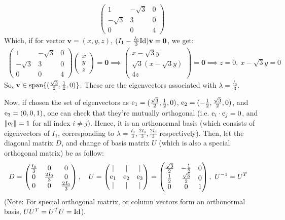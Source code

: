 \documentclass{article}
\newcommand{\Id}{\textmd{Id}} %
\newcommand{\be}{\textmd{e}}
\newcommand{\bv}{\textbf{v}} %
\newcommand{\bzero}{\textbf{0}}
\begin{document}
\begin{itemize}
\begin{align}
\begin{pmatrix}
            1&-\sqrt{3}&0\\
            -\sqrt{3}&3&0\\
            0&0&4
        \end{pmatrix}
    \end{align}
    Which, if for vector $\bv = (x,y,z)$, $(I_1-\frac{I_0}{3}\Id)\bv=\bzero$, we get:
    \begin{align}
        \begin{pmatrix}
            1&-\sqrt{3}&0\\
            -\sqrt{3}&3&0\\
            0&0&4
        \end{pmatrix}\begin{pmatrix}
            x\\y\\z
        \end{pmatrix} = \bzero \implies \begin{pmatrix}
            x-\sqrt{3}y\\ \sqrt{3}(x-\sqrt{3}y)\\ 4z
        \end{pmatrix}=\bzero\implies z=0,\ x-\sqrt{3}y=0
    \end{align}
    So, $\bv\in \textmd{span}\{(\frac{\sqrt{3}}{2},\frac{1}{2},0)\}$. These are the eigenvectors associated with $\lambda = \frac{I_0}{3}$.
\end{itemize}
Now, if chosen the set of eigenvectors as $\be_1 = (\frac{\sqrt{3}}{2},\frac{1}{2},0)$, $\be_2=(-\frac{1}{2},\frac{\sqrt{3}}{2},0)$, and $\be_3 = (0,0,1)$, one can check that they're mutually orthogonal (i.e. $\be_i \cdot \be_j = 0$, and $\|\be_i\|=1$ for all index $i\neq j$). Hence, it is an orthonormal basis (which consists of eigenvectors of $I_1$, corresponding to $\lambda=\frac{I_0}{3},\frac{2I_0}{3},\frac{2I_0}{3}$ respectively). Then, let the diagonal matrix $D$, and change of basis matrix $U$ (which is also a special orthogonal matrix) be as follow:
\begin{align}
    &D=\begin{pmatrix}
        \frac{I_0}{3}&0&0\\
        0&\frac{2I_0}{3}&0\\
        0&0&\frac{2I_0}{3}
    \end{pmatrix}, \quad U = \begin{pmatrix}
        | & |&|\\
        \be_1&\be_2&\be_3\\
        |&|&|
    \end{pmatrix} = \begin{pmatrix}
        \frac{\sqrt{3}}{2}&-\frac{1}{2}&0\\
        \frac{1}{2}&\frac{\sqrt{3}}{2}&0\\
        0&0&1
    \end{pmatrix}, \ U^{-1}=U^T
\end{align}
(Note: For special orthogonal matrix, or column vectors form an orthonormal basis, $UU^T = U^TU = \Id$). 
\end{document}
